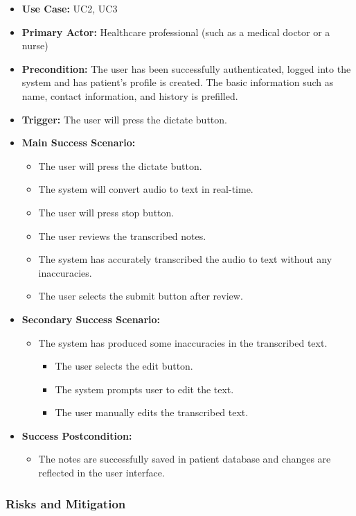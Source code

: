 \documentclass[12pt]{article}
\begin{document}
\begin{itemize}
  \item\textbf{Use Case:} UC2, UC3
  \item\textbf{Primary Actor:} Healthcare professional (such as a medical doctor or a nurse)
  \item\textbf{Precondition:} The user has been successfully authenticated, logged into the system and has patient’s profile is created. The basic information such as name, contact information, and history is prefilled.
  \item\textbf{Trigger:} The user will press the dictate button.
  \item\textbf{Main Success Scenario:}
  \begin{itemize}
    \item The user will press the dictate button.
    \item The system will convert audio to text in real-time.
    \item The user will press stop button.
    \item The user reviews the transcribed notes. 
    \item The system has accurately transcribed the audio to text without any inaccuracies.
    \item The user selects the submit button after review. 
  \end{itemize}
  \item\textbf{Secondary Success Scenario:}
  \begin{itemize}
    \item The system has produced some inaccuracies in the transcribed text.
    \begin{itemize}
      \item The user selects the edit button.
      \item The system prompts user to edit the text.
      \item The user manually edits the transcribed text.
    \end{itemize} 
  \end{itemize}
  \item\textbf{Success Postcondition:}
  \begin{itemize}
    \item The notes are successfully saved in patient database and changes are reflected in the user interface.
  \end{itemize}
\end{itemize}

\subsubsection{Risks and Mitigation}
\end{document}
